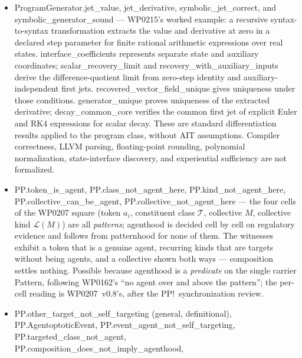 \documentclass[11pt,a4paper]{article}
\newcommand{\lean}[1]{{\ttfamily\small
  \let\leanunderscore\_\def\_{\leanunderscore\allowbreak}#1}}
\begin{document}
\begin{itemize}[leftmargin=1.4em,itemsep=1pt]
{and reconstruction coordinates are supplied; no effective selector or
optimal prefix-machine compiler is constructed. The paper instantiates
$\ell=\lceil\log_2 n\rceil$ by ordinary finite-table coding and charges
any presentation absent from the conditioning context.\par}
\item \lean{ProgramGenerator.jet\_value}, \lean{jet\_derivative},
\lean{symbolic\_jet\_correct}, and \lean{symbolic\_generator\_sound} --- WP0215's
worked example: a recursive syntax-to-syntax transformation extracts the value and derivative
at zero in a declared step parameter for finite rational arithmetic expressions over real states.
\lean{interface\_coefficients} represents separate state and auxiliary coordinates;
\lean{scalar\_recovery\_limit} and \lean{recovery\_with\_auxiliary\_inputs} derive the
difference-quotient limit from zero-step identity and auxiliary-independent first jets.
\lean{recovered\_vector\_field\_unique} gives uniqueness under those conditions.
\lean{generator\_unique} proves uniqueness of the extracted derivative;
\lean{decay\_common\_core} verifies the common first jet of explicit Euler and RK4
expressions for scalar decay. These are standard differentiation results applied to the program
class, without AIT assumptions. Compiler correctness, LLVM parsing, floating-point rounding,
polynomial normalization, state-interface discovery, and experiential sufficiency are not formalized.
\item \lean{PP.token\_is\_agent}, \lean{PP.class\_not\_agent\_here}, \lean{PP.kind\_not\_agent\_here},
\lean{PP.collective\_can\_be\_agent}, \lean{PP.collective\_not\_agent\_here} --- the four cells of the
WP0207 square (token $a_i$, constituent class $\mathcal T$, collective $M$, collective kind
$\mathcal L(M)$) are all \emph{patterns}; agenthood is decided cell by cell on regulatory evidence
and follows from patternhood for none of them. The witnesses exhibit a token that is a genuine
agent, recurring kinds that are targets without being agents, and a collective shown both ways ---
composition settles nothing. Possible because agenthood is a \emph{predicate} on the single carrier
\lean{Pattern}, following WP0162's ``no agent over and above the pattern''; the per-cell reading is
WP0207~v0.8's, after the PP!\ synchronization review.
\item \lean{PP.other\_target\_not\_self\_targeting} (general, definitional),
\lean{PP.AgentoptoticEvent}, \lean{PP.event\_agent\_not\_self\_targeting},
\lean{PP.targeted\_class\_not\_agent}, \lean{PP.composition\_does\_not\_imply\_agenthood},

\end{itemize}
\end{document}
